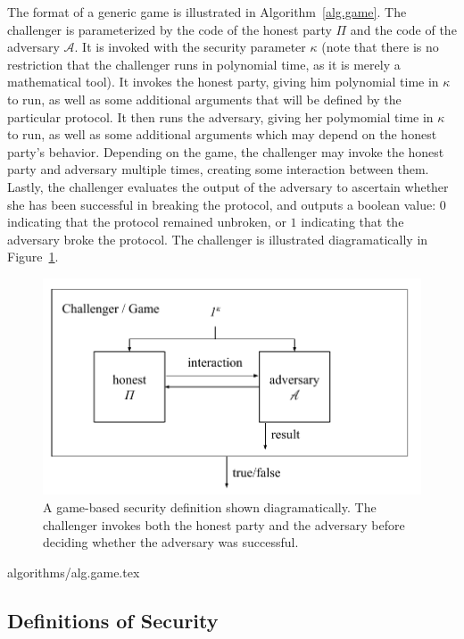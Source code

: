 The format of a generic game is illustrated in Algorithm~\ref{alg.game}. The challenger
is parameterized by the code of the honest party $\Pi$ and the code of the adversary $\mathcal{A}$.
It is invoked with the security parameter $\kappa$ (note that there is no restriction that the challenger
runs in polynomial time, as it is merely a mathematical tool).
It invokes the honest party, giving him polynomial time in $\kappa$ to run, as well as some
additional arguments that will be defined by the particular protocol. It then runs the adversary,
giving
her
polymomial time in $\kappa$ to run, as well as some additional arguments which may
depend on the honest party's behavior. Depending on the game, the challenger may invoke the honest party
and adversary multiple times, creating some interaction between them. Lastly, the challenger evaluates the output of the
adversary to ascertain whether she has been successful in breaking the protocol, and outputs a boolean value:
$0$ indicating that the protocol remained unbroken, or $1$ indicating that the adversary broke the protocol.
The challenger
is illustrated diagramatically in Figure~\ref{fig.game}.

\begin{figure}[h]
    \centering
    \includegraphics[width=0.7 \columnwidth,keepaspectratio]{figures/game-based-security.pdf}
    \caption{A game-based security definition shown diagramatically. The challenger invokes both
    the honest party and the adversary before deciding whether the adversary was successful.}
    \label{fig.game}
\end{figure}

{algorithms/alg.game.tex}

\subsection*{Definitions of Security}

